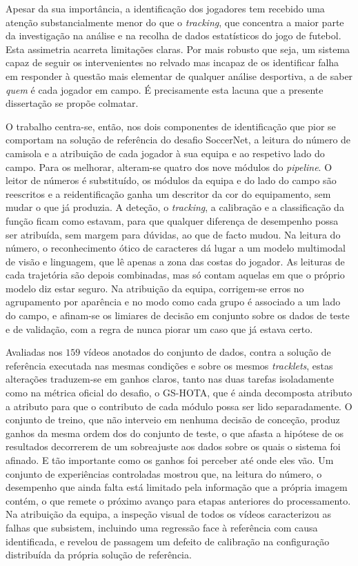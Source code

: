 Apesar da sua importância, a identificação dos jogadores tem recebido uma atenção substancialmente
menor do que o \emph{tracking}, que concentra a maior parte da investigação na análise e na recolha
de dados estatísticos do jogo de futebol. Esta assimetria acarreta limitações claras. Por mais
robusto que seja, um sistema capaz de seguir os intervenientes no relvado mas incapaz de os
identificar falha em responder à questão mais elementar de qualquer análise desportiva, a de saber
\emph{quem} é cada jogador em campo. É precisamente esta lacuna que a presente dissertação se propõe
colmatar.

O trabalho centra-se, então, nos dois componentes de identificação que pior se comportam na
solução de referência do desafio SoccerNet, a leitura do número de camisola e a atribuição de cada
jogador à sua equipa e ao respetivo lado do campo. Para os melhorar, alteram-se quatro dos nove
módulos do \emph{pipeline}. O leitor de números é substituído, os módulos da equipa e do lado do
campo são reescritos e a reidentificação ganha um descritor da cor do equipamento, sem mudar o que
já produzia. A deteção, o \emph{tracking}, a calibração e a classificação da função ficam como estavam,
para que qualquer diferença de desempenho possa ser atribuída, sem margem para dúvidas, ao que de
facto mudou. Na leitura do
número, o reconhecimento ótico de caracteres dá lugar a um modelo multimodal de visão e linguagem,
que lê apenas a zona das costas do jogador. As leituras de cada trajetória são depois combinadas,
mas só contam aquelas em que o próprio modelo diz estar seguro. Na atribuição da equipa, corrigem-se erros no agrupamento por
aparência e no modo como cada grupo é associado a um lado do campo, e afinam-se os limiares de
decisão em conjunto sobre os dados de teste e de validação, com a regra de nunca piorar um caso que
já estava certo.

Avaliadas nos $159$ vídeos anotados do conjunto de dados, contra a solução de referência executada
nas mesmas condições e sobre os mesmos \emph{tracklets}, estas alterações traduzem-se em ganhos
claros, tanto nas duas tarefas isoladamente como na métrica oficial do desafio, o GS-HOTA, que é
ainda decomposta atributo a atributo para que o contributo de cada módulo possa ser lido
separadamente. O conjunto de treino, que não interveio em nenhuma decisão de conceção, produz
ganhos da mesma ordem dos do conjunto de teste, o que afasta a hipótese de os resultados decorrerem
de um sobreajuste aos dados sobre os quais o sistema foi afinado. E tão importante como os ganhos
foi perceber até onde eles vão. Um conjunto de experiências controladas mostrou que, na leitura do
número, o desempenho que ainda falta está limitado pela informação que a própria imagem contém, o
que remete o próximo avanço para etapas anteriores do processamento. Na atribuição da equipa, a
inspeção visual de todos os vídeos caracterizou as falhas que subsistem, incluindo uma regressão
face à referência com causa identificada, e revelou de passagem um defeito de calibração na
configuração distribuída da própria solução de referência.

